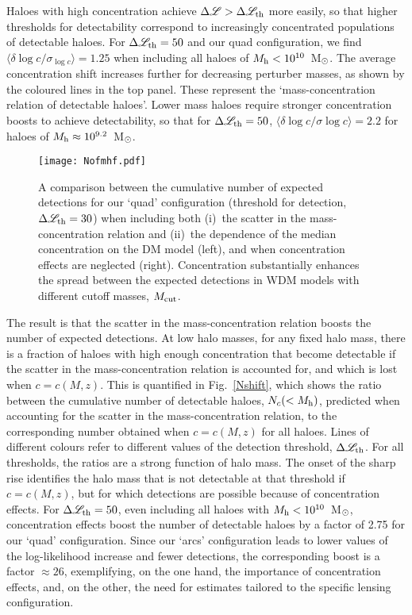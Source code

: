 \documentclass[a4paper, fleqn, usenatbib, useAMS]{mnras}
\def\DL{\Delta\mathscr{L}}
\begin{document}
Haloes with high concentration achieve $\DL>\DL_{\rm th}$ more easily, so that higher
thresholds for detectability correspond to increasingly concentrated populations of
detectable haloes. For $\DL_{\rm th}=50$ and our quad configuration, we find
$\langle\delta\log c/\sigma_{\log c}\rangle = 1.25$ when including all
haloes of $M_{\rm h}<10^{10}$~M$_{\rm \odot}$.   
The average concentration shift increases further for decreasing
perturber masses, 
as shown by the coloured lines in the top panel. These represent the `mass-concentration relation
of detectable haloes'. Lower mass haloes require stronger concentration boosts to achieve 
detectability, so that for $\DL_{\rm th}=50$, 
$\langle\delta\log c/\sigma{\log c}\rangle = 2.2$ for haloes of $M_{\rm h}\approx10^{9.2}$~M$_{\rm \odot}$.

\begin{figure*}
\centering
\texttt{[image: Nofmhf.pdf]}
\caption{A comparison between the cumulative number of expected detections for our `quad'
configuration (threshold for detection, $\DL_{\rm th}=30$) when including both 
(i)~the scatter in the mass-concentration relation and (ii)~the 
dependence of the median concentration on the DM model (left), and when  
concentration effects are neglected (right). Concentration substantially 
enhances the spread between
the expected detections in WDM models with different cutoff masses, $M_{\rm cut}$.}
\label{Nofmhf}
\end{figure*}

The result is that the scatter in the mass-concentration relation
boosts the number of expected detections. {At low halo masses, for any fixed halo mass,} there is a fraction of
haloes with high enough concentration that become detectable if the scatter in the mass-concentration
relation is accounted for, and which is lost when $c=c(M,z)$.  
This is quantified in Fig.~\ref{Nshift}, which shows the ratio between the cumulative number of 
detectable haloes, $N_c(<M_{\rm h})$, predicted when accounting for the scatter in the mass-concentration 
relation, to the corresponding number obtained when $c=c(M,z)$ for all haloes. 
Lines of different colours refer to different values of the detection
threshold, $\DL_{\rm th}$.
For all thresholds, the ratios are a strong function of halo mass. The
onset of the sharp rise identifies
the halo mass that is not detectable at that threshold if $c=c(M,z)$, but for which detections
are possible because of concentration effects. For $\DL_{\rm th}=50$, even including all haloes with $M_{\rm h}<10^{10}$~M$_{\rm \odot}$,
concentration effects boost the number of detectable haloes by a factor of 2.75 for our `quad'
configuration. Since our `arcs' configuration leads to lower values of the log-likelihood
increase and fewer detections, the corresponding boost is a factor $\approx26$, 
exemplifying, on the one hand, the importance of concentration effects, 
and, on the other, the need for estimates tailored to the specific lensing configuration. 
\end{document}
